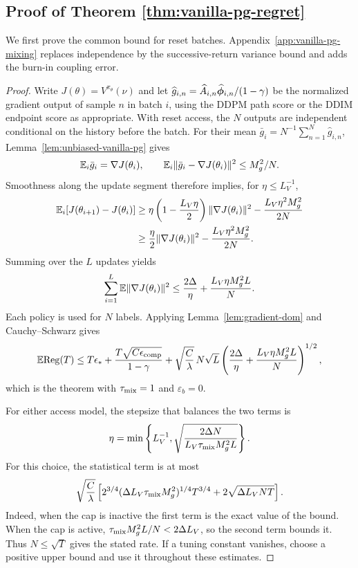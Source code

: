 \subsection{Proof of Theorem \ref{thm:vanilla-pg-regret}}
We first prove the common bound for reset batches. Appendix~\ref{app:vanilla-pg-mixing} replaces independence by the successive-return variance bound and adds the burn-in coupling error.
\begin{proof}
Write $J(\theta)=V^{\pi_\theta}(\nu)$ and let
$\widehat g_{i,n}=\widehat A_{i,n}\widehat{\boldsymbol{\phi}}_{i,n}/(1-\gamma)$ be the normalized gradient output of sample $n$ in batch $i$, using the DDPM path score or the DDIM endpoint score as appropriate. With reset access, the $N$ outputs are independent conditional on the history before the batch. For their mean $\bar g_i=N^{-1}\sum_{n=1}^N\widehat g_{i,n}$, Lemma~\ref{lem:unbiased-vanilla-pg} gives
\[
\mathbb{E}_i\bar g_i=\nabla J(\theta_i),\qquad
\mathbb{E}_i\|\bar g_i-\nabla J(\theta_i)\|^2\leq M_g^2/N.
\]
Smoothness along the update segment therefore implies, for $\eta\leq L_V^{-1}$,
\begin{align*}
\mathbb{E}_i[J(\theta_{i+1})-J(\theta_i)]
&\geq\eta\left(1-\frac{L_V\eta}{2}\right)\|\nabla J(\theta_i)\|^2
-\frac{L_V\eta^2M_g^2}{2N}\\
&\geq\frac\eta2\|\nabla J(\theta_i)\|^2
-\frac{L_V\eta^2M_g^2}{2N}.
\end{align*}
Summing over the $L$ updates yields
\[
\sum_{i=1}^L\mathbb{E}\|\nabla J(\theta_i)\|^2
\leq\frac{2\Delta}{\eta}+\frac{L_V\eta M_g^2L}{N}.
\]
Each policy is used for $N$ labels. Applying Lemma~\ref{lem:gradient-dom} and Cauchy--Schwarz gives
\[
\mathbb{E}\mathrm{Reg}(T)
\leq T\epsilon_*+\frac{T\sqrt{C\epsilon_{\rm comp}}}{1-\gamma}
+\sqrt{\frac C\lambda}\,N\sqrt L
\left(\frac{2\Delta}{\eta}+\frac{L_V\eta M_g^2L}{N}\right)^{1/2},
\]
which is the theorem with $\tau_{\rm mix}=1$ and $\varepsilon_b=0$.

For either access model, the stepsize that balances the two terms is
\[
\eta=\min\left\{L_V^{-1},
\sqrt{\frac{2\Delta N}{L_V\tau_{\rm mix}M_g^2L}}\right\}.
\]
For this choice, the statistical term is at most
\[
\sqrt{\frac C\lambda}\left[
2^{3/4}(\Delta L_V\tau_{\rm mix}M_g^2)^{1/4}T^{3/4}
+2\sqrt{\Delta L_VNT}\right].
\]
Indeed, when the cap is inactive the first term is the exact value of the bound. When the cap is active, $\tau_{\rm mix}M_g^2L/N<2\Delta L_V$, so the second term bounds it. Thus $N\leq\sqrt T$ gives the stated rate. If a tuning constant vanishes, choose a positive upper bound and use it throughout these estimates.


\end{proof}
